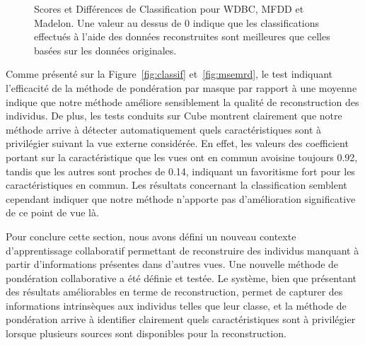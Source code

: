\documentclass[a4paper]{article}
\begin{document}
\begin{figure}[h]
    \quad
    \caption{Scores et Différences de Classification pour WDBC, MFDD et Madelon. Une valeur au dessus de 0 indique que les classifications effectués à l'aide des données reconstruites sont meilleures que celles basées sur les données originales.}
\end{figure}

Comme présenté sur la Figure~\ref{fig:classif} et~\ref{fig:msemrd}, le test indiquant l'efficacité de la méthode de pondération par masque par rapport à une moyenne indique que notre méthode améliore sensiblement la qualité de reconstruction des individus. De plus, les tests conduits sur Cube montrent clairement que notre méthode arrive à détecter automatiquement quels caractéristiques sont à privilégier suivant la vue externe considérée. En effet, les valeurs des coefficient portant sur la caractéristique que les vues ont en commun avoisine toujours 0.92, tandis que les autres sont proches de 0.14, indiquant un favoritisme fort pour les caractéristiques en commun. Les résultats concernant la classification semblent cependant indiquer que notre méthode n'apporte pas d'amélioration significative de ce point de vue là.

Pour conclure cette section, nous avons défini un nouveau contexte d'apprentissage collaboratif permettant de reconstruire des individus manquant à partir d'informations présentes dans d'autres vues. Une nouvelle méthode de pondération collaborative a été définie et testée. Le système, bien que présentant des résultats améliorables en terme de reconstruction, permet de capturer des informations intrinsèques aux individus telles que leur classe, et la méthode de pondération arrive à identifier clairement quels caractéristiques sont à privilégier lorsque plusieurs sources sont disponibles pour la reconstruction.
\end{document}
